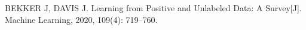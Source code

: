 \begin{thebibliography}{200}
	BEKKER J, DAVIS J. Learning from Positive and Unlabeled Data: A Survey[J]. Machine Learning, 2020, 109(4): 719–760.
	
	










\end{thebibliography}
\clearpage


